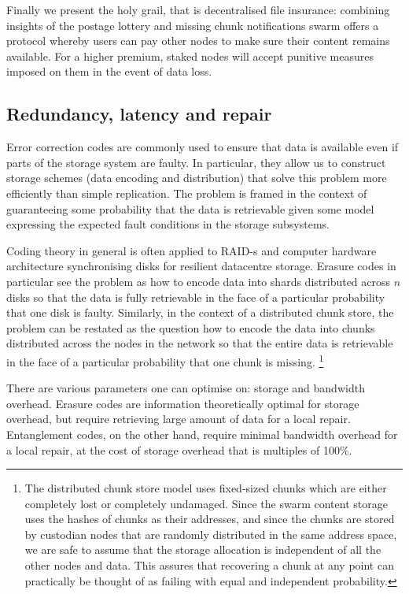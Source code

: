  Finally we present the holy grail, that is decentralised file insurance: combining insights of the postage lottery and missing chunk notifications swarm offers a protocol whereby users can pay other nodes to make sure their content remains available. For a higher premium, staked nodes will accept punitive measures imposed on them in the event of data loss.


\subsection{Redundancy, latency and repair}\label{sec:repair}

Error correction codes are commonly used to ensure that data is available even if parts of the storage system are faulty. In particular, they allow us to construct storage schemes (data encoding and distribution) that solve this problem more efficiently than simple replication. The problem is framed in the context of guaranteeing some probability that the data is retrievable given some model expressing the expected fault conditions in the storage subsystems.

Coding theory in general is often applied to RAID-s and computer hardware architecture synchronising disks for resilient datacentre storage.
Erasure codes in particular see the problem as how to encode data into shards distributed across $n$ disks so that the data is fully retrievable in the face of a particular probability that one disk is faulty.
Similarly, in the context of a distributed chunk store, the problem can be restated as the question how to encode the data into chunks distributed across the nodes in the network so that the entire data is retrievable in the face of a particular probability that one chunk is missing.%
%
\footnote{The distributed chunk store model uses fixed-sized chunks which are either completely lost or completely undamaged. Since the swarm content storage uses the hashes of chunks as their addresses, and since the chunks are stored by custodian nodes that are randomly distributed in the same address space, we are safe to assume that the storage allocation is independent of all the other nodes and data. This assures that recovering a chunk at any point can practically be thought of as failing with equal and independent probability.}

There are various parameters one can optimise on: storage and bandwidth overhead. Erasure codes are information theoretically optimal for storage overhead, but require retrieving large amount of data for a local repair.
Entanglement codes, on the other hand, require minimal bandwidth overhead for a local repair, at the cost of storage overhead that is multiples of 100\%. 

